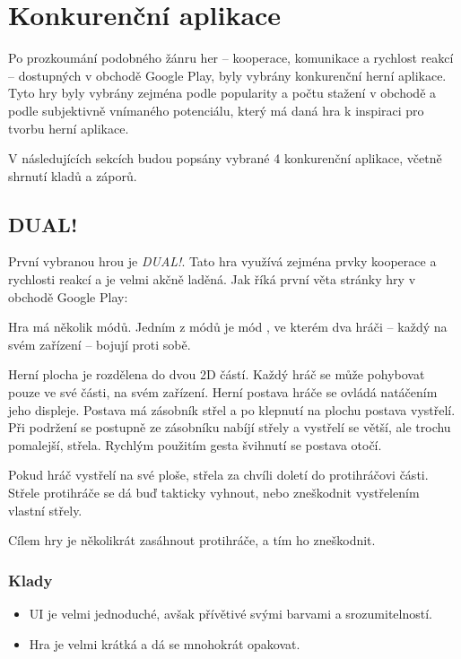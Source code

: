 \chapter{Konkurenční aplikace}

Po prozkoumání podobného žánru her
– kooperace, komunikace a rychlost reakcí –
dostupných v obchodě Google Play,
byly vybrány konkurenční herní aplikace.
Tyto hry byly vybrány zejména podle popularity a počtu stažení v obchodě
a podle subjektivně vnímaného potenciálu,
který má daná hra k inspiraci pro tvorbu herní aplikace.

V následujících sekcích budou popsány vybrané 4 konkurenční aplikace,
včetně shrnutí kladů a záporů.

\section{DUAL!}

První vybranou hrou je \emph{DUAL!}.
Tato hra využívá zejména prvky kooperace a rychlosti reakcí
a je velmi akčně laděná.
Jak říká první věta stránky hry \cite{seabaa_dual} v obchodě Google Play:

Hra má několik módů.
Jedním z módů je mód , ve kterém dva hráči
– každý na svém zařízení –
bojují proti sobě.

Herní plocha je rozdělena do dvou 2D částí.
Každý hráč se může pohybovat pouze ve své části, na svém zařízení.
Herní postava hráče se ovládá natáčením jeho displeje.
Postava má zásobník střel a po klepnutí na plochu postava vystřelí.
Při podržení se postupně ze zásobníku nabíjí střely
a vystřelí se větší, ale trochu pomalejší, střela.
Rychlým použitím gesta švihnutí se postava otočí.

Pokud hráč vystřelí na své ploše,
střela za chvíli doletí do protihráčovi části.
Střele protihráče se dá buď takticky vyhnout,
nebo zneškodnit vystřelením vlastní střely.

Cílem hry je několikrát zasáhnout protihráče, a tím ho zneškodnit.

\FloatBarrier

\subsection*{Klady}

\begin{itemize}
    \item UI je velmi jednoduché, avšak přívětivé svými barvami a srozumitelností.
    \item Hra je velmi krátká a dá se mnohokrát opakovat.
\end{itemize}

